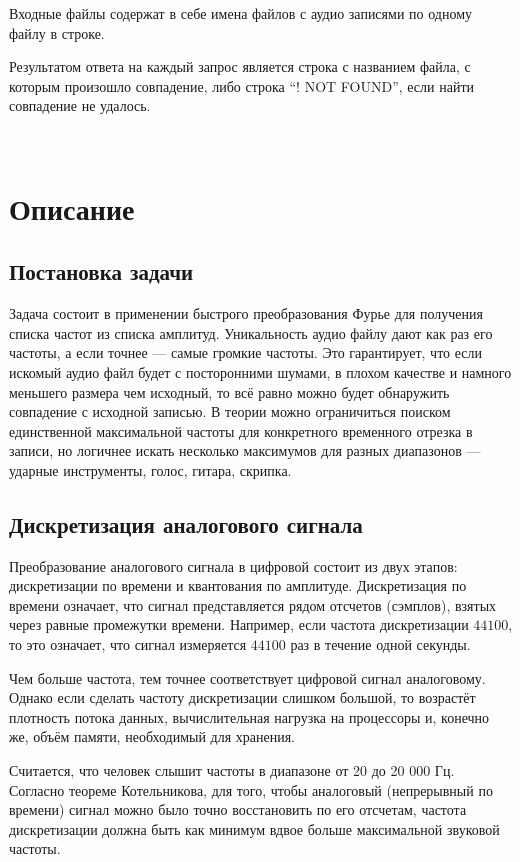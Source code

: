 \documentclass[12pt]{article}
\newcommand{\se}[1]{\section*{\bf #1}}
\begin{document}
Входные файлы содержат в себе имена файлов с аудио записями по одному файлу в строке.

Результатом ответа на каждый запрос является строка с названием файла, с которым
произошло совпадение, либо строка ``! NOT FOUND'', если найти совпадение не удалось.

~
\smallbreak

\se{Описание}
\subsection*{Постановка задачи}

Задача состоит в применении быстрого преобразования Фурье для получения списка частот
из списка амплитуд. Уникальность аудио файлу дают как раз его частоты, а если точнее ---
самые громкие частоты. Это гарантирует, что если искомый аудио файл будет с посторонними
шумами, в плохом качестве и намного меньшего размера чем исходный, то всё равно можно
будет обнаружить совпадение с исходной записью. В теории можно ограничиться поиском
единственной максимальной частоты для конкретного временного отрезка в записи, но
логичнее искать несколько максимумов для разных диапазонов --- ударные инструменты,
голос, гитара, скрипка.

\subsection*{Дискретизация аналогового сигнала}

Преобразование аналогового сигнала в цифровой состоит из двух этапов: дискретизации
по времени и квантования по амплитуде. Дискретизация по времени означает, что сигнал
представляется рядом отсчетов (сэмплов), взятых через равные промежутки времени.
Например, если частота дискретизации $44100$, то это означает, что сигнал измеряется
$44100$ раз в течение одной секунды.

Чем больше частота, тем точнее соответствует цифровой сигнал аналоговому. Однако если
сделать частоту дискретизации слишком большой, то возрастёт плотность потока данных,
вычислительная нагрузка на процессоры и, конечно же, объём памяти, необходимый для хранения.

Считается, что человек слышит частоты в диапазоне от 20 до 20 000 Гц. Согласно
теореме Котельникова, для того, чтобы аналоговый (непрерывный по времени) сигнал можно
было точно восстановить по его отсчетам, частота дискретизации должна быть как минимум
вдвое больше максимальной звуковой частоты.
\end{document}
